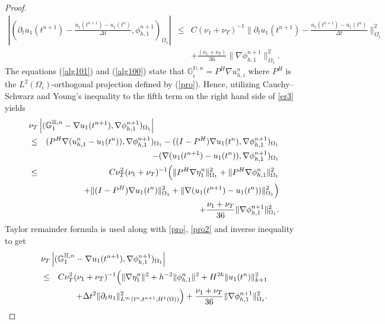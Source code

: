 \documentclass[10pt]{article}%
\numberwithin{equation}{section}
\newcommand{\abs}[1]{\left\vert#1\right\vert}
\begin{document}
\begin{proof}
\begin{eqnarray}
	\abs{(\partial_{t}u_1(t^{n+1})-\frac{{u_1(t^{n+1})}-u_{1}(t^{n})}{\Delta t} ,\phi_{h,1}^{n+1})_{\Omega_1}}&\leq&C{ (\nu_1+\nu_T)}^{-1}\|\partial_t u_1(t^{n+1})-\frac{{u_1(t^{n+1})}-u_{1}(t^{n})}{\Delta t}\|_{\Omega_1}^2\nonumber\\&&+\frac{{ (\nu_1+\nu_T)}}{36}\|\nabla \phi_{h,1}^{n+1}\|_{\Omega_1}^2.%
	\label{err5}
	\end{eqnarray}
		The equations (\ref{alg101}) and (\ref{alg100}) state that $\mathbb{G}_i^{\mathbb{H},n}=P^H \nabla u_{h,i}^n$ where $P^H$ is the $L^2(\Omega_i)$-orthogonal projection defined by (\ref{pro}). Hence, utilizing Cauchy–Schwarz and Young's inequality to the fifth term on the right hand side of \eqref{er3} yields %
	\begin{eqnarray}
	\lefteqn{\nu_T\abs{(\mathbb{G}_1^{\mathbb{H},n}-\nabla u_1(t^{n+1}),\nabla \phi_{h,1}^{n+1})_{{\Omega_1}}}}\nonumber\\&\leq&(P^H \nabla (u_{h,1}^n-u_{1}(t^n)),\nabla \phi_{h,1}^{n+1})_{{\Omega_1}}-((I-P^H )\nabla u_{1}(t^n),\nabla \phi_{h,1}^{n+1})_{{\Omega_1}}\nonumber\\&&-(\nabla ( u_1(t^{n+1})-u_{1}(t^n)),\nabla \phi_{h,1}^{n+1})_{{\Omega_1}}\nonumber\\&\leq&C\nu_T^2(\nu_1+\nu_T)^{-1}\Big(\|P^H \nabla\eta_1^n\|_{\Omega_1}^2+\|P^H\nabla\phi_{h,1}^n\|_{\Omega_1}^2\nonumber\\&&+\|(I-P^H )\nabla u_{1}(t^n)\|_{\Omega_1}^2+\|\nabla ( u_1(t^{n+1})-u_{1}(t^n))\|_{\Omega_1}^2\Big)\nonumber\\
	&&+{\frac{\nu_1+\nu_T}{36}\|\nabla \phi_{h,1}^{n+1}\|_{\Omega_1}^2}. \label{er1}
	\end{eqnarray}
Taylor remainder formula is used along with \eqref{pro}, \eqref{pro2} and inverse inequality to get
		\begin{eqnarray}
\lefteqn{	\nu_T\abs{(\mathbb{G}_1^{\mathbb{H},n}-\nabla u_1(t^{n+1}),\nabla \phi_{h,1}^{n+1})_{{\Omega_1}}}}\nonumber\\&\leq&C\nu_T^2(\nu_1+\nu_T)^{-1}\Big(\|\nabla \eta_1^n\|^2+h^{-2}\|\phi_{h,1}^n\|^2+H^{2k}\|u_1(t^n)\|_{k+1}^2\nonumber\\&&+\Delta t^2\|\partial_t u_1\|_{L^{\infty}(t^n,t^{n+1};H^1(\Omega))}^2\Big) +{\frac{\nu_1+\nu_T}{36}\|\nabla \phi_{h,1}^{n+1}\|_{\Omega_1}^2}.\label{er2}

\end{eqnarray}
\end{proof}
\end{document}
